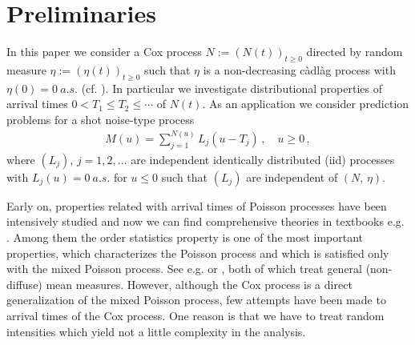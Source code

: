 \documentclass[11pt,leqno%
]{amsart}
\newcommand{\1}{{\mathbf 1}}
\begin{document}
\section{Preliminaries} 
In this paper we consider a Cox process $N:=(N(t))_{t\ge 0}$ directed by
random measure $\eta:=(\eta(t))_{t\ge 0}$ such that $\eta$ is a non-decreasing
c\`adl\`ag process with $\eta(0)=0\ a.s.$ (cf. \cite[p.44]{grandell:1997}). In particular we investigate
distributional properties of arrival times $0<T_1 \le T_2 \le \cdots$ of
$N(t)$. 
As an application we consider prediction problems for a shot noise-type process
 \begin{align}\label{eq:cpp}
 M(u)%
 =\sum_{j=1}^{N(u)} L_{j}(u-T_{j})\,, \quad u\ge 0\,,
 \end{align}
 where $(L_j),\,j=1,2,\ldots$ are 
 independent identically distributed (iid) processes with $L_j(u)=0\ a.s.$ for
 $u\le 0$ such that $(L_j)$ are independent of $(N,\,\eta)$. 
 
 Early on, properties related with arrival times of Poisson processes have been intensively
 studied and now we can find comprehensive theories in textbooks
 e.g. \cite{kallenberg:1983,grandell:1997,embrechts:kluppelberg:mikosch:1997,mikosch:2009}. Among them the order statistics
 property is one of the most important properties, which characterizes
 the Poisson process and which is satisfied
 only with the mixed Poisson process. See e.g. \cite[Theorem 9.1, Corollary
 9.2]{kallenberg:1983} or \cite{matthes:kerstan:mecke:1978}, both of
 which treat general (non-diffuse) mean measures.  
 However, although the Cox process is a
 direct generalization of the mixed Poisson process, few attempts have
 been made to arrival times of the Cox process.   
 One reason is that we have to treat random intensities which yield not
 a little complexity in the analysis. 
\end{document}
